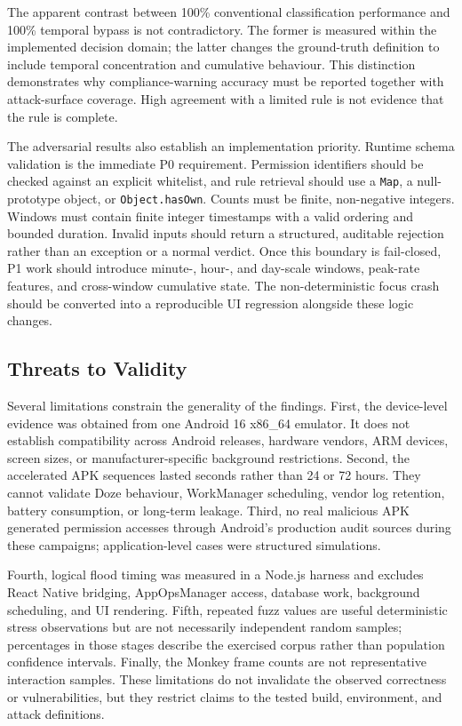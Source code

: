 The apparent contrast between 100\% conventional classification performance and 100\% temporal bypass is not contradictory. The former is measured within the implemented decision domain; the latter changes the ground-truth definition to include temporal concentration and cumulative behaviour. This distinction demonstrates why compliance-warning accuracy must be reported together with attack-surface coverage. High agreement with a limited rule is not evidence that the rule is complete.

The adversarial results also establish an implementation priority. Runtime schema validation is the immediate P0 requirement. Permission identifiers should be checked against an explicit whitelist, and rule retrieval should use a \texttt{Map}, a null-prototype object, or \texttt{Object.hasOwn}. Counts must be finite, non-negative integers. Windows must contain finite integer timestamps with a valid ordering and bounded duration. Invalid inputs should return a structured, auditable rejection rather than an exception or a normal verdict. Once this boundary is fail-closed, P1 work should introduce minute-, hour-, and day-scale windows, peak-rate features, and cross-window cumulative state. The non-deterministic focus crash should be converted into a reproducible UI regression alongside these logic changes.

\subsection{Threats to Validity}

Several limitations constrain the generality of the findings. First, the device-level evidence was obtained from one Android 16 x86\_64 emulator. It does not establish compatibility across Android releases, hardware vendors, ARM devices, screen sizes, or manufacturer-specific background restrictions. Second, the accelerated APK sequences lasted seconds rather than 24 or 72 hours. They cannot validate Doze behaviour, WorkManager scheduling, vendor log retention, battery consumption, or long-term leakage. Third, no real malicious APK generated permission accesses through Android's production audit sources during these campaigns; application-level cases were structured simulations.

Fourth, logical flood timing was measured in a Node.js harness and excludes React Native bridging, AppOpsManager access, database work, background scheduling, and UI rendering. Fifth, repeated fuzz values are useful deterministic stress observations but are not necessarily independent random samples; percentages in those stages describe the exercised corpus rather than population confidence intervals. Finally, the Monkey frame counts are not representative interaction samples. These limitations do not invalidate the observed correctness or vulnerabilities, but they restrict claims to the tested build, environment, and attack definitions.

